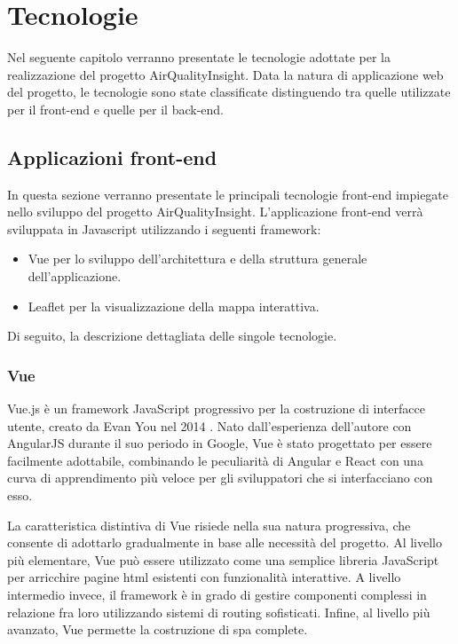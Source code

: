 \clearpage{\pagestyle{empty}\cleardoublepage}

\chapter{Tecnologie}

Nel seguente capitolo verranno presentate le tecnologie adottate per la realizzazione del progetto AirQualityInsight.
Data la natura di applicazione web del progetto, le tecnologie sono state classificate distinguendo tra quelle
utilizzate per il front-end e quelle per il back-end.

\section{Applicazioni front-end}

In questa sezione verranno presentate le principali tecnologie front-end impiegate nello sviluppo
del progetto AirQualityInsight.
L'applicazione front-end verrà sviluppata in Javascript utilizzando i seguenti framework:
\begin{itemize}
  \item Vue per lo sviluppo dell'architettura e della struttura generale dell'applicazione.
  \item Leaflet per la visualizzazione della mappa interattiva.
\end{itemize}

Di seguito, la descrizione dettagliata delle singole tecnologie.

\subsection{Vue}

Vue.js è un framework JavaScript progressivo per la costruzione di interfacce utente,
creato da Evan You nel 2014 \cite{vue2014}. Nato dall'esperienza dell'autore con AngularJS \cite{angularjs2010}
durante il suo periodo in Google, Vue è stato progettato per essere facilmente adottabile,
combinando le peculiarità di Angular e React \cite{react2013} con una curva di apprendimento più veloce
per gli sviluppatori che si interfacciano con esso.

La caratteristica distintiva di Vue risiede nella sua natura progressiva, che consente di adottarlo gradualmente in base
alle necessità del progetto. Al livello più elementare, Vue può essere utilizzato come una semplice libreria JavaScript
per arricchire pagine \acrshort{html} esistenti con funzionalità interattive. A livello intermedio invece, il framework
è in grado di gestire componenti complessi in relazione fra loro utilizzando sistemi di routing sofisticati. Infine,
al livello più avanzato, Vue permette la costruzione di \acrfull{spa} \cite{mdn2024spa} complete.

